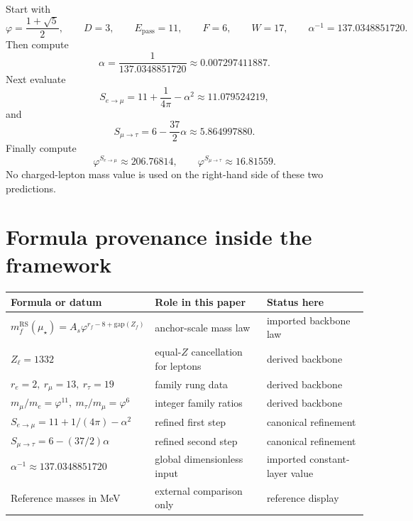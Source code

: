 \documentclass[11pt]{article}
\newcommand{\phig}{\varphi}
\newcommand{\mustar}{\mu_\star}
\newcommand{\Epass}{E_{\mathrm{pass}}}
\begin{document}
Start with
\[
\phig=\frac{1+\sqrt5}{2},
\qquad
D=3,
\qquad
\Epass=11,
\qquad
F=6,
\qquad
W=17,
\qquad
\alpha^{-1}=137.0348851720.
\]
Then compute
\[
\alpha=\frac{1}{137.0348851720}\approx0.007297411887.
\]
Next evaluate
\[
S_{e\to\mu}=11+\frac{1}{4\pi}-\alpha^2\approx11.079524219,
\]
and
\[
S_{\mu\to\tau}=6-\frac{37}{2}\alpha\approx5.864997880.
\]
Finally compute
\[
\phig^{S_{e\to\mu}}\approx206.76814,
\qquad
\phig^{S_{\mu\to\tau}}\approx16.81559.
\]
No charged-lepton mass value is used on the right-hand side of these two predictions.

\section{Formula provenance inside the framework}

\begin{center}
\begin{tabular}{|l|l|l|}
\hline
Formula or datum & Role in this paper & Status here \\
\hline
\(m_f^{\mathrm{RS}}(\mustar)=A_s\phig^{r_f-8+\mathrm{gap}(Z_f)}\) & anchor-scale mass law & imported backbone law \\
\hline
\(Z_\ell=1332\) & equal-\(Z\) cancellation for leptons & derived backbone \\
\hline
\(r_e=2,\ r_\mu=13,\ r_\tau=19\) & family rung data & derived backbone \\
\hline
\(m_\mu/m_e=\phig^{11},\ m_\tau/m_\mu=\phig^6\) & integer family ratios & derived backbone \\
\hline
\(S_{e\to\mu}=11+1/(4\pi)-\alpha^2\) & refined first step & canonical refinement \\
\hline
\(S_{\mu\to\tau}=6-(37/2)\alpha\) & refined second step & canonical refinement \\
\hline
\(\alpha^{-1}\approx137.0348851720\) & global dimensionless input & imported constant-layer value \\
\hline
Reference masses in MeV & external comparison only & reference display \\
\hline
\end{tabular}
\end{center}
\end{document}
